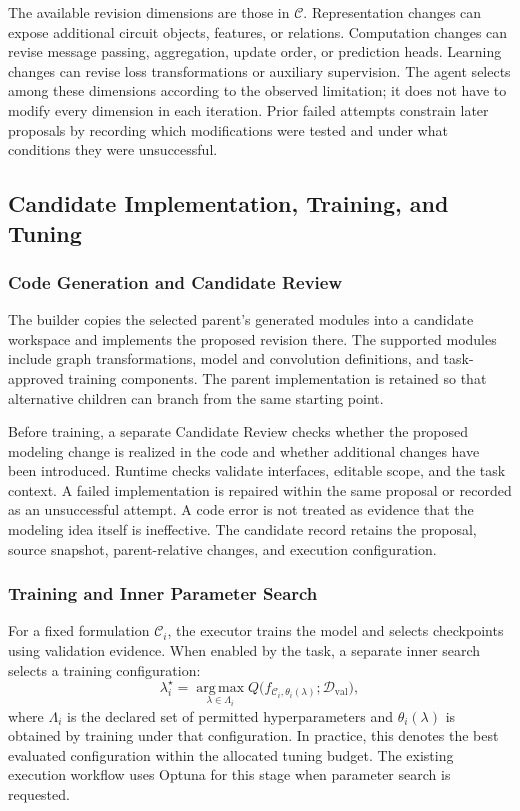 The available revision dimensions are those in $\mathcal{C}$. Representation changes can expose additional circuit objects, features, or relations. Computation changes can revise message passing, aggregation, update order, or prediction heads. Learning changes can revise loss transformations or auxiliary supervision. The agent selects among these dimensions according to the observed limitation; it does not have to modify every dimension in each iteration. Prior failed attempts constrain later proposals by recording which modifications were tested and under what conditions they were unsuccessful.

\subsection{Candidate Implementation, Training, and Tuning}
\label{sec:scoped_realization}

\subsubsection{Code Generation and Candidate Review}

The builder copies the selected parent's generated modules into a candidate workspace and implements the proposed revision there. The supported modules include graph transformations, model and convolution definitions, and task-approved training components. The parent implementation is retained so that alternative children can branch from the same starting point.

Before training, a separate Candidate Review checks whether the proposed modeling change is realized in the code and whether additional changes have been introduced. Runtime checks validate interfaces, editable scope, and the task context. A failed implementation is repaired within the same proposal or recorded as an unsuccessful attempt. A code error is not treated as evidence that the modeling idea itself is ineffective. The candidate record retains the proposal, source snapshot, parent-relative changes, and execution configuration.

\subsubsection{Training and Inner Parameter Search}

For a fixed formulation $\mathcal{C}_i$, the executor trains the model and selects checkpoints using validation evidence. When enabled by the task, a separate inner search selects a training configuration:
\begin{equation}
 \lambda_i^\star=\operatorname*{arg\,max}_{\lambda\in\Lambda_i}
 Q\big(f_{\mathcal{C}_i,\theta_i(\lambda)};
 \mathcal{D}_{\mathrm{val}}\big),
 \label{eq:param_search}
\end{equation}
where $\Lambda_i$ is the declared set of permitted hyperparameters and $\theta_i(\lambda)$ is obtained by training under that configuration. In practice, this denotes the best evaluated configuration within the allocated tuning budget. The existing execution workflow uses Optuna for this stage when parameter search is requested.

